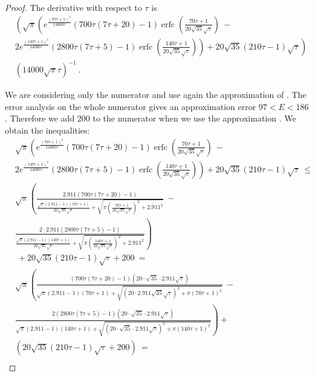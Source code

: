 \documentclass{article}
\renewcommand{\leq}{\leqslant}
\DeclareMathOperator{\erfc}{erfc}
\begin{document}
\begin{proof}
The derivative with respect to $\tau$ is 
\begin{align}
&\left(\sqrt{\pi } \left(e^{\frac{(70 \tau+1)^2}{14000 \tau}} (700 \tau (7  \tau+20)-1) \erfc \left(\frac{70 \tau+1}{20 \sqrt{35} \sqrt{\tau}}\right)\ -\right.\right.\\\nonumber &\left.\left.2 e^{\frac{(140 \tau+1)^2}{14000 \tau}} (2800 \tau (7  \tau+5)-1) \erfc \left(\frac{140 \tau+1}{20 \sqrt{35} \sqrt{\tau}}\right)\right)+20 \sqrt{35} (210 \tau-1) \sqrt{\tau}\right)\\ \nonumber &\left(14000 \sqrt{\pi } \tau\right)^{-1} \ .
\end{align}

We are considering only the numerator and use again the approximation
of \citet{Ren:07}.
The error analysis on the whole numerator gives an approximation error $97<E<186$. Therefore
we add 200 to the numerator when we use the approximation \citet{Ren:07}.
We obtain the inequalities:
\begin{align}
&\sqrt{\pi } \left(e^{\frac{(70 \tau+1)^2}{14000 \tau}} (700 \tau (7  \tau+20)-1) \erfc \left(\frac{70 \tau+1}{20 \sqrt{35} \sqrt{\tau}}\right) \ -\right.\\\nonumber &\left.2 e^{\frac{(140 \tau+1)^2}{14000 \tau}} (2800 \tau (7  \tau+5)-1) \erfc \left(\frac{140 \tau+1}{20 \sqrt{35} \sqrt{\tau}}\right)\right)+20 \sqrt{35} (210 \tau-1) \sqrt{\tau}\ \leq \\ \nonumber & \sqrt{\pi } \left(\frac{2.911 (700 \tau (7  \tau+20)-1)}{\frac{\sqrt{\pi } (2.911 -1) (70 \tau+1)}{20 \sqrt{35} \sqrt{\tau}}+\sqrt{\pi  \left(\frac{70 \tau+1}{20 \sqrt{35} \sqrt{\tau}}\right)^2+2.911^2}} \ -\right.\\\nonumber &\left.\frac{2 \cdot 2.911 (2800 \tau (7  \tau+5)-1)}{\frac{\sqrt{\pi } (2.911 -1) (140 \tau+1)}{20 \sqrt{35} \sqrt{\tau}}+\sqrt{\pi  \left(\frac{140 \tau+1}{20 \sqrt{35} \sqrt{\tau}}\right)^2+2.911^2}}\right) \\ \nonumber &\ +20 \sqrt{35} (210 \tau-1) \sqrt{\tau}+200\ = \\ \nonumber &
\sqrt{\pi } \left(\frac{(700 \tau (7  \tau+20)-1) \left(20 \cdot  \sqrt{35} \cdot  2.911 \sqrt{\tau}\right)}{\sqrt{\pi } (2.911 -1) (70 \tau+1)+\sqrt{\left(20 \cdot   2.911 \sqrt{35} \sqrt{\tau}\right)^2+\pi  (70 \tau+1)^2}} \ -\right.\\\nonumber &\left.\frac{2 (2800 \tau (7  \tau+5)-1) \left(20 \cdot \sqrt{35} \cdot  2.911 \sqrt{\tau}\right)}{\sqrt{\pi } (2.911 -1) (140 \tau+1)+\sqrt{\left(20 \cdot \sqrt{35} \cdot 2.911 \sqrt{\tau}\right)^2+\pi  (140 \tau+1)^2}}\right)+\\ \nonumber &\left(20 \sqrt{35} (210 \tau-1) \sqrt{\tau}+200\right)\ = \\ \nonumber &

\end{align}
\end{proof}
\end{document}
